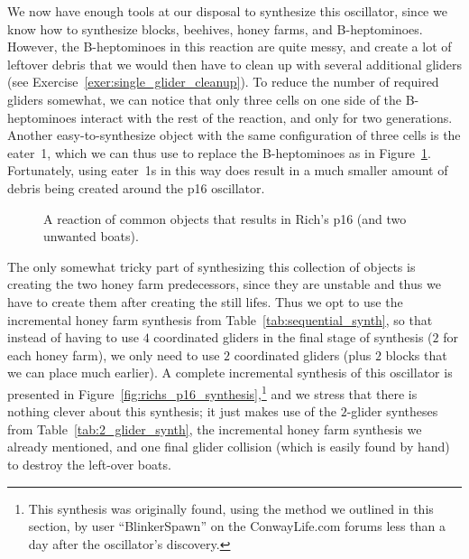 We now have enough tools at our disposal to synthesize this oscillator, since we know how to synthesize blocks, beehives, honey farms, and B-heptominoes. However, the B-heptominoes in this reaction are quite messy, and create a lot of leftover debris that we would then have to clean up with several additional gliders (see Exercise~\ref{exer:single_glider_cleanup}). To reduce the number of required gliders somewhat, we can notice that only three cells on one side of the B-heptominoes interact with the rest of the reaction, and only for two generations. Another easy-to-synthesize object with the same configuration of three cells is the eater~1, which we can thus use to replace the B-heptominoes as in Figure~\ref{fig:richs_p16_predecessor}. Fortunately, using eater~1s in this way does result in a much smaller amount of debris being created around the p16 oscillator.

\begin{figure}[!ht]
	\centering{}
	\caption{A reaction of common objects that results in Rich's p16 (and two unwanted boats).}\label{fig:richs_p16_predecessor}
\end{figure}

The only somewhat tricky part of synthesizing this collection of objects is creating the two honey farm predecessors, since they are unstable and thus we have to create them after creating the still lifes. Thus we opt to use the incremental honey farm synthesis from Table~\ref{tab:sequential_synth}, so that instead of having to use $4$ coordinated gliders in the final stage of synthesis ($2$ for each honey farm), we only need to use $2$ coordinated gliders (plus $2$ blocks that we can place much earlier). A complete incremental synthesis of this oscillator is presented in Figure~\ref{fig:richs_p16_synthesis},\footnote{This synthesis was originally found, using the method we outlined in this section, by user ``BlinkerSpawn'' on the ConwayLife.com forums less than a day after the oscillator's discovery.} and we stress that there is nothing clever about this synthesis; it just makes use of the $2$-glider syntheses from Table~\ref{tab:2_glider_synth}, the incremental honey farm synthesis we already mentioned, and one final glider collision (which is easily found by hand) to destroy the left-over boats.

